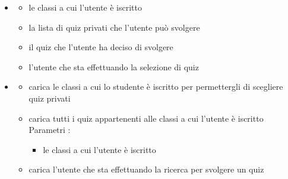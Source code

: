 \begin{itemize}
\item {}
\begin{itemize}
\item {}
\newline
le classi a cui l'utente è iscritto
\item {}
\newline
la lista di quiz privati che l'utente può svolgere
\item {}
\newline
il quiz che l'utente ha deciso di svolgere
\item {}
\newline
l'utente che sta effettuando la selezione di quiz
\end{itemize}
\item {}
\begin{itemize}
\item {}
\newline
carica le classi a cui lo studente è iscritto per permettergli di scegliere quiz privati
\newline
\item {}
\newline
carica tutti i quiz appartenenti alle classi a cui l'utente è iscritto
\newline
Parametri :
\begin{itemize}
\item {}
\newline
le classi a cui l'utente è iscritto
\end{itemize}
\item {}
\newline
carica l'utente che sta effettuando la ricerca per svolgere un quiz
\newline
\end{itemize}
\end{itemize}
